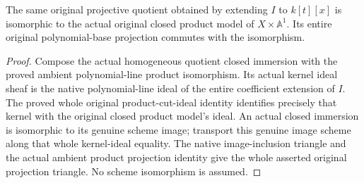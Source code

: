 \begin{lemma}
\label{lem:c0n-family-original-product-iso}
\leanok
The same original projective quotient obtained by extending $I$ to
$k[t][x]$ is isomorphic to the actual original closed product model of
$X\times\mathbb A^1$. Its entire original polynomial-base projection
commutes with the isomorphism.
\end{lemma}
\begin{proof}
Compose the actual homogeneous quotient closed immersion with the proved
ambient polynomial-line product isomorphism. Its actual kernel ideal
sheaf is the native polynomial-line ideal of the entire coefficient
extension of $I$. The proved whole original product-cut-ideal identity
identifies precisely that kernel with the original closed product model's
ideal. An actual closed immersion is isomorphic to its genuine scheme
image; transport this genuine image scheme along that whole kernel-ideal
equality. The native image-inclusion triangle and the actual ambient
product projection identity give the whole asserted original projection
triangle. No scheme isomorphism is assumed.
\end{proof}

